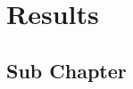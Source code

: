 
\section{Results}
\label{sec: Chapter 4}
\lipsum[4]

\subsection{Sub Chapter}
\label{sec: sub chapter in chapter 4}
\lipsum[5]



